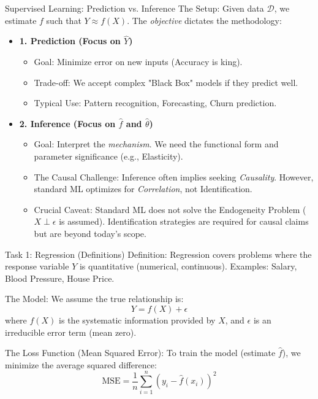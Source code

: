 \documentclass[aspectratio=169]{beamer}
\newcommand{\1}{\mathbf{1}}
\newcommand{\D}{\mathcal{D}}
\begin{document}
\begin{frame}{Supervised Learning: Prediction vs. Inference}
    \small
    \vspace{0.5em}
    The Setup: Given data $\D$, we estimate $f$ such that $Y \approx f(X)$.
    The \textit{objective} dictates the methodology:
    \begin{itemize}
        \setlength\itemsep{1.2em} 
        
        \item \textbf{1. Prediction (Focus on $\hat{Y}$)}
        \begin{itemize}
            \item Goal: Minimize error on new inputs (Accuracy is king).
            \item Trade-off: We accept complex "Black Box" models if they predict well.
            \item Typical Use: Pattern recognition, Forecasting, Churn prediction.
        \end{itemize}

        \item \textbf{2. Inference (Focus on $\hat{f}$ and $\hat{\theta}$)}
        \begin{itemize}
            \item Goal: Interpret the \textit{mechanism}. We need the functional form and parameter significance (e.g., Elasticity).
            \item The Causal Challenge: 
            Inference often implies seeking \textit{Causality}. However, standard ML optimizes for \textit{Correlation}, not Identification.
            \item Crucial Caveat: 
            Standard ML does not solve the Endogeneity Problem ($X \perp \epsilon$ is assumed). Identification strategies are required for causal claims but are beyond today's scope.
        \end{itemize}
    \end{itemize}
\end{frame}

\begin{frame}{Task 1: Regression (Definitions)}
    Definition:
    Regression covers problems where the response variable $Y$ is quantitative (numerical, continuous). Examples: Salary, Blood Pressure, House Price.

    \vspace{0.5em}
    The Model:
    We assume the true relationship is:
    $$ Y = f(X) + \epsilon $$
    where $f(X)$ is the systematic information provided by $X$, and $\epsilon$ is an irreducible error term (mean zero).

    \vspace{0.5em}
    The Loss Function (Mean Squared Error):
    To train the model (estimate $\hat{f}$), we minimize the average squared difference:
    $$ \text{MSE} = \frac{1}{n} \sum_{i=1}^n \left( y_i - \hat{f}(x_i) \right)^2 $$
\end{frame}
\end{document}
